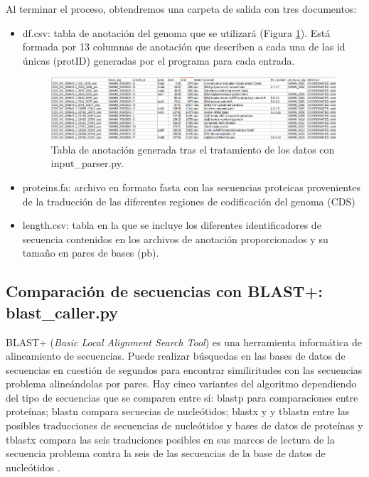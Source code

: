 Al terminar el proceso, obtendremos una carpeta de salida con tres documentos:

\begin{itemize}
\item df.csv: tabla de anotación del genoma que se utilizará (Figura \ref{fig:annot_table}). Está formada por 13 columnas de anotación que describen a cada una de las id únicas (protID) generadas por el programa para cada entrada. 

\begin{figure}[h]
	\centering
	\captionsetup{width=\linewidth} 
	\includegraphics[width=\linewidth]{figs/annot_table.png}
	\caption[Tabla de anotación del genoma]{Tabla de anotación generada tras el tratamiento de los datos con input\_parser.py.}
	\label{fig:annot_table}
\end{figure}


\item proteins.fa: archivo en formato fasta con las secuencias proteicas provenientes de la traducción de las diferentes regiones de codificación del genoma (CDS)
\item length.csv: tabla en la que se incluye los diferentes identificadores de secuencia contenidos en los archivos de anotación proporcionados y su tamaño en pares de bases (pb).
\end{itemize}

\subsection{Comparación de secuencias con BLAST+: blast\_caller.py}
BLAST+ (\textit{Basic Local Alignment Search Tool}) es una herramienta informática de alineamiento de secuencias. Puede realizar búsquedas en las bases de datos de secuencias en cuestión de segundos para encontrar similiritudes con las secuencias problema alineándolas por pares. Hay cinco variantes del algoritmo dependiendo del tipo de secuencias que se comparen entre sí: blastp para comparaciones entre proteínas; blastn compara secuecias de nucleótidos; blastx y y tblastn entre las posibles traducciones de secuencias de nucleótidos y bases de datos de proteínas y tblastx compara las seis traduciones posibles en sus marcos de lectura de la secuencia problema contra la seis de las secuencias de la base de datos de nucleótidos \cite{madden_blast_2003, altschul_basic_1990}.

